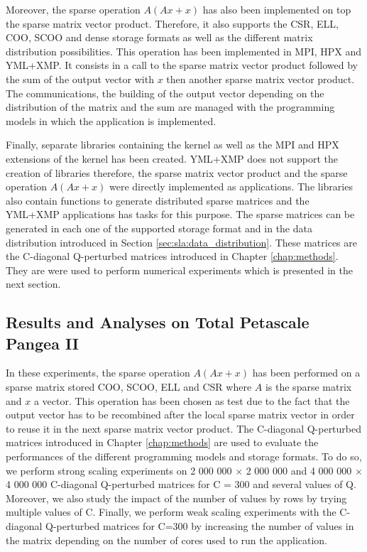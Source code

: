 Moreover, the sparse operation $A(Ax+x)$ has also been implemented on top the sparse matrix vector product.
Therefore, it also supports the CSR, ELL, COO, SCOO and dense storage formats as well as the different matrix distribution possibilities.
This operation has been implemented in MPI, HPX and YML+XMP.
It consists in a call to the sparse matrix vector product followed by the sum of the output vector with $x$ then another sparse matrix vector product.
The communications, the building of the output vector depending on the distribution of the matrix and the sum are managed with the programming models in which the application is implemented.

Finally, separate libraries containing the kernel as well as the MPI and HPX extensions of the kernel has been created.
YML+XMP does not support the creation of libraries therefore, the sparse matrix vector product and the sparse operation $A(Ax+x)$ were directly implemented as applications.
The libraries also contain functions to generate distributed sparse matrices and the YML+XMP applications has tasks for this purpose.
The sparse matrices can be generated in each one of the supported storage format and in the data distribution introduced in Section \ref{sec:sla:data_distribution}.
These matrices are the C-diagonal Q-perturbed matrices introduced in Chapter \ref{chap:methods}.
They are were used to perform numerical experiments which is presented in the next section.


\subsection{Results and Analyses on Total Petascale Pangea II}
In these experiments, the sparse operation $A(Ax+x)$ has been performed on a sparse matrix stored COO, SCOO, ELL and CSR where $A$ is the sparse matrix and $x$ a vector.
This operation has been chosen as test due to the fact that the output vector has to be recombined after the local sparse matrix vector in order to reuse it in the next sparse matrix vector product.
The C-diagonal Q-perturbed matrices introduced in Chapter \ref{chap:methods} are used to evaluate the performances of the different programming models and storage formats.
To do so, we perform strong scaling experiments on 2 000 000 $\times$ 2 000 000 and 4 000 000 $\times$ 4 000 000 C-diagonal Q-perturbed matrices for C = 300 and several values of Q.
Moreover, we also study the impact of the number of values by rows by trying multiple values of C.
Finally, we perform weak scaling experiments with the C-diagonal Q-perturbed matrices for C=300 by increasing the number of values in the matrix depending on the number of cores used to run the application.

